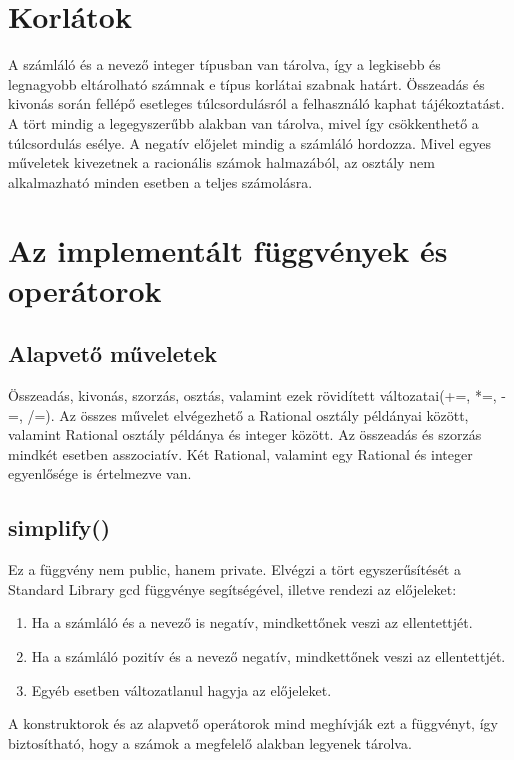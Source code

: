 \documentclass[a4paper, 12pt]{article}
\begin{document}
\section{Korlátok}
A számláló és a nevező integer típusban van tárolva, így a legkisebb és legnagyobb eltárolható számnak e típus korlátai szabnak határt. 
\newline
Összeadás és kivonás során fellépő esetleges túlcsordulásról a felhasználó kaphat tájékoztatást.
\newline
A tört mindig a legegyszerűbb alakban van tárolva, mivel így csökkenthető a túlcsordulás esélye.
\newline
A negatív előjelet mindig a számláló hordozza.
\newline
Mivel egyes műveletek kivezetnek a racionális számok halmazából, az osztály nem alkalmazható minden esetben a teljes számolásra. 

\section{Az implementált függvények és operátorok}
\subsection*{Alapvető műveletek}
Összeadás, kivonás, szorzás, osztás, valamint ezek rövidített változatai(+=, *=, -=, /=). Az összes művelet elvégezhető a Rational osztály példányai között, valamint Rational osztály példánya és integer között. Az összeadás és szorzás mindkét esetben asszociatív.
Két Rational, valamint egy Rational és integer egyenlősége is értelmezve van.
\subsection*{simplify()}
Ez a függvény nem public, hanem private. Elvégzi a tört egyszerűsítését a Standard Library gcd függvénye segítségével, illetve rendezi az előjeleket:
\begin{enumerate}
  \item Ha a számláló és a nevező is negatív, mindkettőnek veszi az ellentettjét.
  \item  Ha a számláló pozitív és a nevező negatív, mindkettőnek veszi az ellentettjét.
  \item  Egyéb esetben változatlanul hagyja az előjeleket.
\end{enumerate}
\noindent
 A konstruktorok és az alapvető operátorok mind meghívják ezt a függvényt, így biztosítható, hogy a számok a megfelelő alakban legyenek tárolva.
\end{document}
